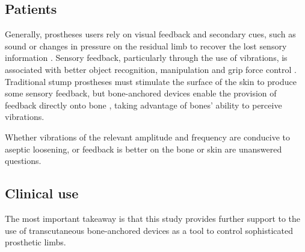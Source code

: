 \subsection{Patients}
Generally, prostheses users rely on visual feedback and secondary cues, such as sound or changes in pressure on the residual limb to recover the lost sensory information \cite{schofield_applications_2014}.
Sensory feedback, particularly through the use of vibrations, is associated with better object recognition, manipulation and grip force control \cite{schiefer_artificial_2018, rosenbaum-chou_development_2016}.
Traditional stump prostheses must stimulate the surface of the skin to produce some sensory feedback, but bone-anchored devices enable the provision of feedback directly onto bone \cite{OrgelMarcus2021Oito}, taking advantage of bones' ability to perceive vibrations.

Whether vibrations of the relevant amplitude and frequency are conducive to aseptic loosening, or feedback is better on the bone or skin are unanswered questions.

\subsection{Clinical use}

The most important takeaway is that this study provides further support to the use of transcutaneous bone-anchored devices as a tool to control sophisticated prosthetic limbs.